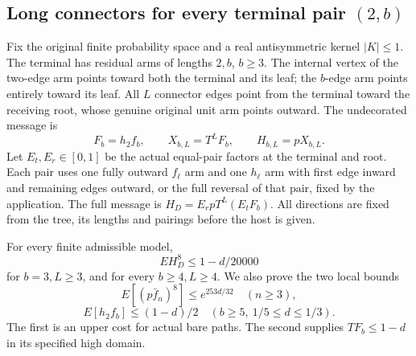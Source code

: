 \subsection{Long connectors for every terminal pair \((2,\allowbreak b)\)}\label{proof:Q5-C086}
Fix the original finite probability space and a real antisymmetric kernel \(|K|\le\allowbreak 1\).
The terminal has residual arms of lengths \(2,\allowbreak b\), \(b\ge\allowbreak 3\).
The internal vertex of the two-edge arm points toward both the terminal and its leaf; the \(b\)-edge arm points entirely toward its leaf.
All \(L\) connector edges point from the terminal toward the receiving root, whose genuine original unit arm points outward.
The undecorated message is
\[
F_b=h_2f_b,\qquad X_{b,L}=T^LF_b,\qquad H_{b,L}=pX_{b,L}.
\tag{Q86.0.1}\label{eq:Q86:0.1}
\]
Let \(E_t,\allowbreak E_r\in[0,\allowbreak 1]\) be the actual equal-pair factors at the terminal and root.
Each pair uses one fully outward \(f_\ell\) arm and one \(h_\ell\) arm with first edge inward and remaining edges outward, or the full reversal of that pair, fixed by the application.
The full message is \(H_D=\allowbreak E_rpT^L(E_tF_b)\).
All directions are fixed from the tree, its lengths and pairings before the host is given.

For every finite admissible model,
\[
\boxed{E H_D^8\le1-d/20000}
\tag{Q86.0.2}\label{eq:Q86:0.2}
\]
for \(b=\allowbreak 3,\allowbreak L\ge\allowbreak 3\), and for every \(b\ge\allowbreak 4,\allowbreak L\ge\allowbreak 4\).
We also prove the two local bounds
\[
\boxed{E[(p \bar f_n)^8]\le e^{253d/32}\quad(n\ge3),}
\tag{Q86.0.3}\label{eq:Q86:0.3}
\]
\[
\boxed{E[h_2f_b]\le(1-d)/2\quad(b\ge5,\ 1/5\le d\le1/3).}
\tag{Q86.0.4}\label{eq:Q86:0.4}
\]
The first is an upper cost for actual bare paths. The second supplies
\(TF_b\le\allowbreak 1-d\) in its specified high domain.

